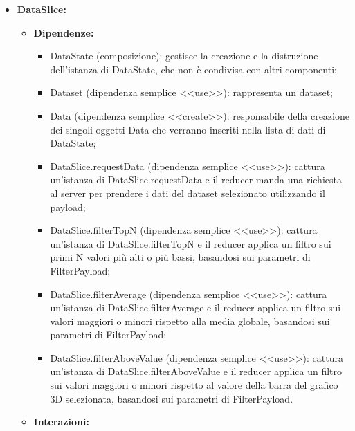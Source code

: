 \begin{itemize}
    \item \textbf{DataSlice:}
          \begin{itemize}
              \item \textbf{Dipendenze:}
                    \begin{itemize}
                        \item DataState (composizione): gestisce la creazione e la distruzione dell'istanza
                              di DataState, che non è condivisa con altri componenti;
                        \item Dataset (dipendenza semplice <<use>>): rappresenta un dataset;
                        \item Data (dipendenza semplice <<create>>): responsabile della creazione dei singoli
                              oggetti Data che verranno inseriti nella lista di dati di DataState;
                        \item DataSlice.requestData (dipendenza semplice <<use>>): cattura un'istanza di
                              DataSlice.requestData e il reducer manda una richiesta al server per prendere i
                              dati del dataset selezionato utilizzando il payload;
                        \item DataSlice.filterTopN (dipendenza semplice <<use>>): cattura un'istanza di
                              DataSlice.filterTopN e il reducer applica un filtro sui primi N valori più alti
                              o più bassi, basandosi sui parametri di FilterPayload;
                        \item DataSlice.filterAverage (dipendenza semplice <<use>>): cattura un'istanza di
                              DataSlice.filterAverage e il reducer applica un filtro sui valori maggiori o
                              minori rispetto alla media globale, basandosi sui parametri di FilterPayload;
                        \item DataSlice.filterAboveValue (dipendenza semplice <<use>>): cattura un'istanza di
                              DataSlice.filterAboveValue e il reducer applica un filtro sui valori maggiori o
                              minori rispetto al valore della barra del grafico 3D selezionata, basandosi sui
                              parametri di FilterPayload.
                    \end{itemize}
              \item \textbf{Interazioni:}
                    \begin{itemize}

\end{itemize}
\end{itemize}
\end{itemize}
